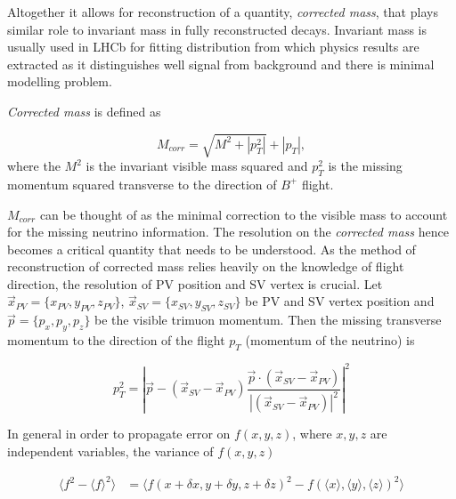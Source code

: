 Altogether it allows for reconstruction of a quantity, \textit{corrected mass}, that plays similar role to invariant mass in fully reconstructed decays. Invariant mass is usually used in \Gls{LHCb} for fitting distribution from which physics results are extracted as it distinguishes well signal from background and there is minimal modelling problem.

\textit{Corrected mass} is defined as

\begin{equation}
	M_{corr} = \sqrt{{M}^{2} + |p^{2}_{T}|} + |p_{T}|,
\end{equation}	
where the $M^{2}$ is the invariant visible mass squared and $p^{2}_{T}$ is the missing momentum squared transverse to the direction of $B^{+}$ flight.


$M_{corr}$ can be thought of as the minimal correction to the visible mass to account for the missing neutrino information. The resolution on the \textit{corrected mass} hence becomes a critical quantity that needs to be understood. As the method of reconstruction of corrected mass relies heavily on the knowledge of \Bpm flight direction, the resolution of \Gls{PV} position and \Gls{SV} vertex is crucial. Let $\vec{{x}}_{PV}=\{x_{PV},y_{PV},z_{PV}\}$, $\vec{{x}}_{SV}=\{x_{SV},y_{SV},z_{SV}\} $ be \Gls{PV} and \Gls{SV} vertex position and $\vec{p}=\{p_{x},p_{y},p_{z}\}$ be the visible trimuon momentum. Then the missing transverse momentum to the direction of the flight $p_{T}$ (momentum of the neutrino) is


\begin{equation}
	p^{2}_{T} = |\vec{p} - (\vec{{x}}_{SV}-\vec{{x}}_{PV})\frac{\vec{p} \cdot(\vec{{x}}_{SV}-\vec{{x}}_{PV})}{|(\vec{{x}}_{SV}-\vec{{x}}_{PV})|^{2}}|^{2}
\end{equation}

In general in order to propagate error on $f(x,y,z)$, where $x,y,z$ are independent variables, the variance of $f(x,y,z)$

\begin{equation}
\begin{aligned}
	\langle f^{2}-\langle f \rangle^{2} \rangle  &=  \langle f(x+\delta x, y+\delta y, z+\delta z)^{2} - f(\langle x \rangle, \langle y \rangle, \langle z \rangle)^{2} \rangle \\
\end{aligned}
\end{equation}

